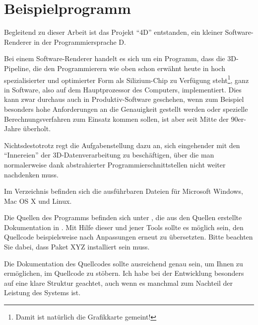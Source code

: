 \chapter{Beispielprogramm}

Begleitend zu dieser Arbeit ist das Projekt \enquote{4D} entstanden, ein kleiner Software-Renderer in der Programmiersprache D.

Bei einem Software-Renderer handelt es sich um ein Programm, dass die 3D-Pipeline, die den Programmierern wie oben schon erwähnt heute in hoch spezialisierter und optimierter Form als Silizium-Chip zu Verfügung steht\footnote{Damit ist natürlich die Grafikkarte gemeint!}, ganz in Software, also auf dem Hauptprozessor des Computers, implementiert. Dies kann zwar durchaus auch in Produktiv-Software geschehen, wenn zum Beispiel besonders hohe Anforderungen an die Genauigkeit gestellt werden oder spezielle Berechnungsverfahren zum Einsatz kommen sollen, ist aber seit Mitte der 90er-Jahre überholt.

Nichtsdestotrotz regt die Aufgabenstellung dazu an, sich eingehender mit den \enquote{Innereien} der 3D-Datenverarbeitung zu beschäftigen, über die man normalerweise dank abstrahierter Programmierschnittstellen nicht weiter nachdenken muss.

Im Verzeichnis  befinden sich die ausführbaren Dateien für Microsoft Windows, Mac OS X und Linux.

Die Quellen des Programms befinden sich unter , die aus den Quellen erstellte Dokumentation in . Mit Hilfe dieser und jener Tools sollte es möglich sein, den Quellcode beispielsweise nach Anpassungen erneut zu übersetzten. Bitte beachten Sie dabei, dass Paket XYZ installiert sein muss.

Die Dokumentation des Quellcodes sollte ausreichend genau sein, um Ihnen zu ermöglichen, im Quellcode zu stöbern. Ich habe bei der Entwicklung besonders auf eine klare Struktur geachtet, auch wenn es manchmal zum Nachteil der Leistung des Systems ist.